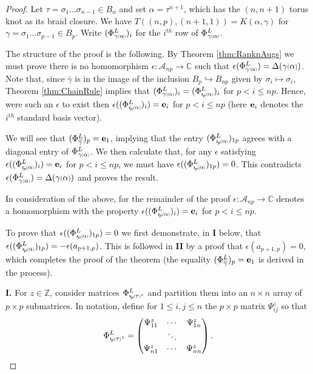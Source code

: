 \documentclass[11pt]{amsart}
\def\Z{{\mathbb Z}}
\def\C{{\mathbb C}}
\def\A{{\mathcal A}}
\def\s{{\sigma}}
\newcommand*{\smallp}[1]{\scalebox{.75}{\ensuremath#1}}
\newcommand*{\subsmallp}[1]{\scalebox{.5}{\ensuremath#1}}
\newcommand{\subpp}[2][p]{\imath_{\hspace*{-1pt}#1}\hspace*{-.5pt}\subsmallp(#2\subsmallp)}
\theoremstyle{definition}
\begin{document}
\begin{proof}
Let $\tau = \s_1\ldots\s_{n-1}\in B_n$ and set $\alpha = \tau^{n+1}$, which has the $(n,n+1)$ torus knot as its braid closure. We have $T((n,p),(n+1,1)) = K(\alpha,\gamma)$ for $\gamma=\s_1\ldots\s_{p-1}\in B_p$. Write $(\Phi_{\gamma\subsmallp(\alpha\subsmallp)}^L)_i$ for the $i^{th}$ row of $\Phi_{\gamma\subsmallp(\alpha\subsmallp)}^L$.

The structure of the proof is the following. By Theorem \ref{thm:RanknAugs} we must prove there is no homomorphism $\epsilon:\A_{np}\to\C$ such that $\epsilon(\Phi_{\gamma\subsmallp(\alpha\subsmallp)}^L)=\Delta(\gamma\smallp(\alpha\smallp))$. Note that, since $\overline\gamma$ is in the image of the inclusion $B_p\hookrightarrow B_{np}$ given by $\s_i\mapsto\s_i$, Theorem \ref{thm:ChainRule} implies that $(\Phi_{\gamma\subsmallp(\alpha\subsmallp)}^L)_i=(\Phi_{\subpp\alpha}^L)_i$ for $p<i\le np$. Hence, were such an $\epsilon$ to exist then $\epsilon((\Phi_{\subpp\alpha}^L)_i) = {\bf e}_{i}$ for $p < i \le np$ (here ${\bf e}_i$ denotes the $i^{th}$ standard basis vector). 

We will see that $(\Phi_{\overline\gamma}^L)_p={\bf e}_1$, implying that the entry $(\Phi_{\subpp\alpha}^L)_{1p}$ agrees with a diagonal entry of $\Phi_{\gamma\subsmallp(\alpha\subsmallp)}^L$. We then calculate that, for any $\epsilon$ satisfying $\epsilon((\Phi_{\subpp\alpha}^L)_i) = {\bf e}_{i}$ for $p < i \le np$, we must have $\epsilon((\Phi_{\subpp\alpha}^L)_{1p})=0$. This contradicts $\epsilon(\Phi_{\gamma\subsmallp(\alpha\subsmallp)}^L) = \Delta(\gamma\smallp(\alpha\smallp))$ and proves the result.

In consideration of the above, for the remainder of the proof $\epsilon:\A_{np}\to\C$ denotes a homomorphism with the property $\epsilon((\Phi_{\subpp\alpha}^L)_i) = {\bf e}_{i}$ for $p < i \le np$.

To prove that $\epsilon((\Phi_{\subpp\alpha}^L)_{1p})=0$ we first demonstrate, in {\bf I} below, that $\epsilon((\Phi_{\subpp\alpha}^L)_{1p})=-\epsilon(a_{p+1,p})$. This is followed in {\bf II} by a proof that $\epsilon(a_{p+1,p})=0$, which completes the proof of the theorem (the equality $(\Phi_{\overline\gamma}^L)_p={\bf e}_1$ is derived in the process).

{\bf I.} For $z\in\Z$, consider matrices $\Phi_{\subpp\tau^z}^L$ and partition them into an $n\times n$ array of $p\times p$ submatrices. In notation, define for $1\le i,j\le n$ the $p\times p$ matrix $\Psi_{ij}^z$ so that
    \[ \Phi_{\subpp\tau^z}^L = \begin{pmatrix}\Psi_{11}^z & \cdots & \Psi_{1n}^z \\ & \ddots & \\ \Psi_{n1}^z & \cdots & \Psi_{nn}^z\end{pmatrix}.\]


\end{proof}
\end{document}
